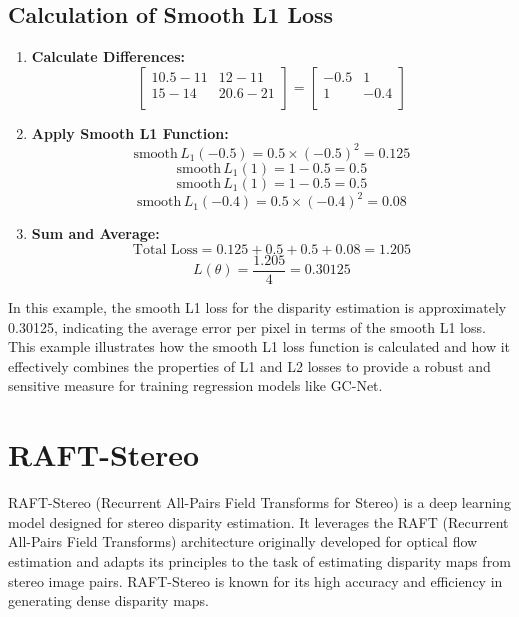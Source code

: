 \documentclass[22pt]{report}
\begin{document}
\subsection*{Calculation of Smooth L1 Loss}
\begin{enumerate}
    \item \textbf{Calculate Differences:}
            \[
            \begin{bmatrix}
            10.5 - 11 & 12 - 11 \\
            15 - 14 & 20.6 - 21 \\
            \end{bmatrix}
            =
            \begin{bmatrix}
            -0.5 & 1 \\
            1 & -0.4 \\
            \end{bmatrix}
            \]
    \item \textbf{Apply Smooth L1 Function:}
            \[
            \text{smooth} \, L_1(-0.5) = 0.5 \times (-0.5)^2 = 0.125
            \]
            \[
            \text{smooth} \, L_1(1) = 1 - 0.5 = 0.5
            \]
            \[
            \text{smooth} \, L_1(1) = 1 - 0.5 = 0.5
            \]
            \[
            \text{smooth} \, L_1(-0.4) = 0.5 \times (-0.4)^2 = 0.08
            \]
    \item \textbf{Sum and Average:}
            \[
            \text{Total Loss} = 0.125 + 0.5 + 0.5 + 0.08 = 1.205
            \]
            \[
            L(\theta) = \frac{1.205}{4} = 0.30125
            \]
\end{enumerate}
\vspace{8}
In this example, the smooth L1 loss for the disparity estimation is approximately 0.30125, indicating the average error per pixel in terms of the smooth L1 loss. This example illustrates how the smooth L1 loss function is calculated and how it effectively combines the properties of L1 and L2 losses to provide a robust and sensitive measure for training regression models like GC-Net.


\section{RAFT-Stereo}
RAFT-Stereo (Recurrent All-Pairs Field Transforms for Stereo) is a deep learning model designed for stereo disparity estimation. It leverages the RAFT (Recurrent All-Pairs Field Transforms) architecture originally developed for optical flow estimation and adapts its principles to the task of estimating disparity maps from stereo image pairs. RAFT-Stereo is known for its high accuracy and efficiency in generating dense disparity maps.\\
\end{document}
